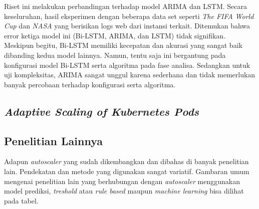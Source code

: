 Riset ini melakukan perbandingan terhadap model ARIMA dan LSTM. Secara keseluruhan, hasil eksperimen dengan beberapa data set seperti \textit{The FIFA World Cup} dan \textit{NASA} yang berisikan logs web dari instansi terkait. Ditemukan bahwa error ketiga model ini (Bi-LSTM, ARIMA, dan LSTM) tidak signifikan. Meskipun begitu, Bi-LSTM memiliki kecepatan dan akurasi yang sangat baik dibanding kedua model lainnya. Namun, tentu saja ini bergantung pada konfigurasi model Bi-LSTM serta algoritma pada fase analisa. Sedangkan untuk uji kompleksitas, ARIMA sangat unggul karena sederhana dan tidak memerlukan banyak percobaan terhadap konfigurasi serta algoritma.

\subsection{\textit{Adaptive Scaling of Kubernetes Pods}}

\subsection{Penelitian Lainnya}

Adapun \textit{autoscaler} yang sudah dikembangkan dan dibahas di banyak penelitian lain. Pendekatan dan metode yang digunakan sangat variatif. Gambaran umum mengenai penelitian lain yang berhubungan dengan \textit{autoscaler} menggunakan model prediksi, \textit{treshold} atau \textit{rule based} maupun \textit{machine learning} bisa dilihat pada tabel.

